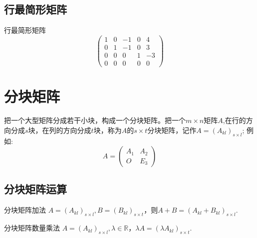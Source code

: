 \documentclass[lang=cn,10pt]{elegantbook}
\begin{document}
\subsection{行最简形矩阵}
\begin{definition}{行最简形矩阵}
    \begin{equation}
    \begin{pmatrix}
        1 & 0 & -1 & 0 & 4 \\
        0 & 1 & -1 & 0 & 3 \\
        0 & 0 &  0 & 1 & -3\\
        0 & 0 &  0 & 0 & 0
    \end{pmatrix}
\end{equation}
\end{definition}


\section{分块矩阵}
\begin{definition}
    把一个大型矩阵分成若干小块，构成一个分块矩阵。把一个$m \times n$矩阵$A$,在行的方向分成$s$块，在列的方向分成$t$块，称为$A$的$s \times t$分块矩阵，记作$A = (A_{kl})_{s \times l}$;
    例如:
    \begin{equation}
        A = \begin{pmatrix}
        A_1 & A_2\\
        O & E_3
        \end{pmatrix}
    \end{equation}
\end{definition}

\subsection{分块矩阵运算}
\begin{definition}{分块矩阵加法}
    $A = (A_{kl})_{s \times l},B = (B_{kl})_{s \times t}$，则$A + B = (A_{kl}+ B_{kl})_{s \times l}$.
\end{definition}

\begin{definition}{分块矩阵数量乘法}
    $A = (A_{kl})_{s \times l}, \lambda \in \mathbb{R}$，$\lambda A = (\lambda A_{kl})_{s \times t}$.
\end{definition}
\end{document}

